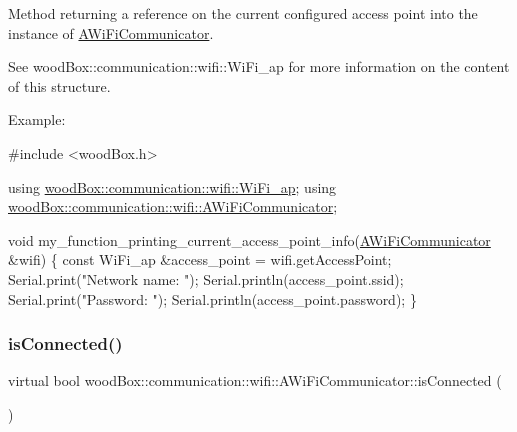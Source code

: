 Method returning a reference on the current configured access point into the instance of \mbox{\hyperlink{classwood_box_1_1communication_1_1wifi_1_1_a_wi_fi_communicator}{A\+Wi\+Fi\+Communicator}}.

See wood\+Box\+::communication\+::wifi\+::\+Wi\+Fi\+\_\+ap for more information on the content of this structure.

Example\+:


\begin{DoxyCode}
\textcolor{preprocessor}{#include <woodBox.h>}

\textcolor{keyword}{using} \mbox{\hyperlink{structwood_box_1_1communication_1_1wifi_1_1s__wifi__access__point}{woodBox::communication::wifi::WiFi\_ap}};
\textcolor{keyword}{using} \mbox{\hyperlink{classwood_box_1_1communication_1_1wifi_1_1_a_wi_fi_communicator}{woodBox::communication::wifi::AWiFiCommunicator}};

\textcolor{keywordtype}{void} my\_function\_printing\_current\_access\_point\_info(\mbox{\hyperlink{classwood_box_1_1communication_1_1wifi_1_1_a_wi_fi_communicator_a9d1dc13ca9243170b04211bef2b86ed2}{AWiFiCommunicator}} &wifi) \{
  \textcolor{keyword}{const} WiFi\_ap &access\_point = wifi.getAccessPoint;
  Serial.print(\textcolor{stringliteral}{"Network name: "});
  Serial.println(access\_point.ssid);
  Serial.print(\textcolor{stringliteral}{"Password: "});
  Serial.println(access\_point.password);
\}
\end{DoxyCode}
 \mbox{\label{classwood_box_1_1communication_1_1wifi_1_1_a_wi_fi_communicator_afe42af0100dd483564995b8fc54b2e71}} 
\subsubsection{\texorpdfstring{is\+Connected()}{isConnected()}}
{\footnotesize\ttfamily virtual bool wood\+Box\+::communication\+::wifi\+::\+A\+Wi\+Fi\+Communicator\+::is\+Connected (\begin{DoxyParamCaption}{ }\end{DoxyParamCaption})\hspace{0.3cm}{\ttfamily [pure virtual]}}

